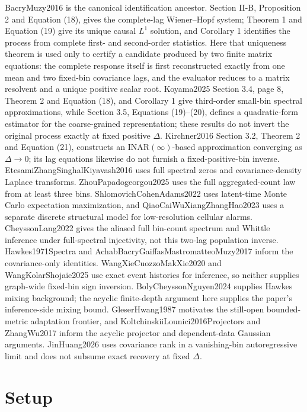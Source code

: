 \documentclass{article}
\begin{document}
BacryMuzy2016 is the canonical identification ancestor. Section II-B, Proposition 2 and Equation (18), gives the complete-lag Wiener--Hopf system; Theorem 1 and Equation (19) give its unique causal \(L^1\) solution, and Corollary 1 identifies the process from complete first- and second-order statistics. Here that uniqueness theorem is used only to certify a candidate produced by two finite matrix equations: the complete response itself is first reconstructed exactly from one mean and two fixed-bin covariance lags, and the evaluator reduces to a matrix resolvent and a unique positive scalar root. Koyama2025 Section 3.4, page 8, Theorem 2 and Equation (18), and Corollary 1 give third-order small-bin spectral approximations, while Section 3.5, Equations (19)--(20), defines a quadratic-form estimator for the coarse-grained representation; these results do not invert the original process exactly at fixed positive \(\Delta\). Kirchner2016 Section 3.2, Theorem 2 and Equation (21), constructs an INAR\((\infty)\)-based approximation converging as \(\Delta\to0\); its lag equations likewise do not furnish a fixed-positive-bin inverse. EtesamiZhangSinghalKiyavash2016 uses full spectral zeros and covariance-density Laplace transforms. ZhouPapadogeorgou2025 uses the full aggregated-count law from at least three bins. ShlomovichCohenAdams2022 uses latent-time Monte Carlo expectation maximization, and QiaoCaiWuXiangZhangHao2023 uses a separate discrete structural model for low-resolution cellular alarms. CheyssonLang2022 gives the aliased full bin-count spectrum and Whittle inference under full-spectral injectivity, not this two-lag population inverse. Hawkes1971Spectra and AchabBacryGaiffasMastromatteoMuzy2017 inform the covariance-only identities. WangXieCuozzoMakXie2020 and WangKolarShojaie2025 use exact event histories for inference, so neither supplies graph-wide fixed-bin sign inversion. BolyCheyssonNguyen2024 supplies Hawkes mixing background; the acyclic finite-depth argument here supplies the paper's inference-side mixing bound. GleserHwang1987 motivates the still-open bounded-metric adaptation frontier, and KoltchinskiiLounici2016Projectors and ZhangWu2017 inform the acyclic projector and dependent-data Gaussian arguments. JinHuang2026 uses covariance rank in a vanishing-bin autoregressive limit and does not subsume exact recovery at fixed \(\Delta\).

\section{Setup}
\end{document}
